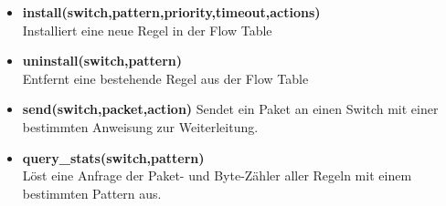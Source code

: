 \documentclass[10pt,conference]{IEEEtran}
\begin{document}
\begin{itemize}
	\item \textbf{install(switch,pattern,priority,timeout,actions)}\\
	Installiert eine neue Regel in der Flow Table
	\item \textbf{uninstall(switch,pattern)}\\
	Entfernt eine bestehende Regel aus der Flow Table
	\item \textbf{send(switch,packet,action)}
	Sendet ein Paket an einen Switch mit einer bestimmten Anweisung zur Weiterleitung.
	\item \textbf{query\_stats(switch,pattern)}\\
	Löst eine Anfrage der Paket- und Byte-Zähler aller Regeln mit einem bestimmten Pattern aus.
\end{itemize}
\end{document}
